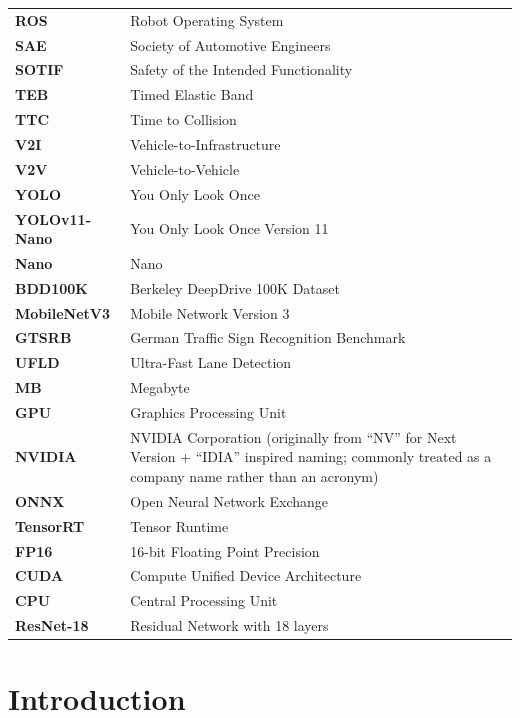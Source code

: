 \documentclass[12pt, a4paper]{report}
\begin{document}
\begin{longtable}{@{}ll@{}}
    \textbf{ROS} & Robot Operating System \\
    \textbf{SAE} & Society of Automotive Engineers \\
    \textbf{SOTIF} & Safety of the Intended Functionality \\
    \textbf{TEB} & Timed Elastic Band \\
    \textbf{TTC} & Time to Collision \\
    \textbf{V2I} & Vehicle-to-Infrastructure \\
    \textbf{V2V} & Vehicle-to-Vehicle \\
    \textbf{YOLO} & You Only Look Once \\
    \textbf{YOLOv11-Nano} & You Only Look Once Version 11 \\
    \textbf{Nano} & Nano \\
    \textbf{BDD100K} & Berkeley DeepDrive 100K Dataset \\
    \textbf{MobileNetV3} & Mobile Network Version 3 \\
    \textbf{GTSRB} & German Traffic Sign Recognition Benchmark \\
    \textbf{UFLD} & Ultra-Fast Lane Detection \\
    \textbf{MB} & Megabyte \\
    \textbf{GPU} & Graphics Processing Unit \\
    \textbf{NVIDIA} & NVIDIA Corporation (originally from “NV” for Next Version + “IDIA” inspired naming; commonly treated as a company name rather than an acronym) \\
    \textbf{ONNX} & Open Neural Network Exchange \\
    \textbf{TensorRT} & Tensor Runtime \\
    \textbf{FP16} & 16-bit Floating Point Precision \\
    \textbf{CUDA} & Compute Unified Device Architecture \\
    \textbf{CPU} & Central Processing Unit \\
    \textbf{ResNet-18} & Residual Network with 18 layers \\
\end{longtable}
\newpage

\renewcommand{\thepage}{\arabic{page}} %
\setcounter{page}{1} %

\chapter{Introduction}
\end{document}
